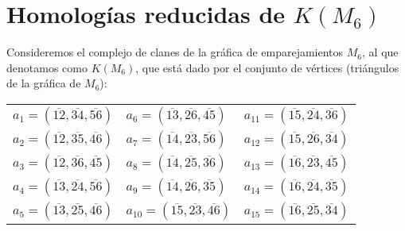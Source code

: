 \documentclass[12pt]{book}
\theoremstyle{definition}
\newcounter{in}
\begin{document}
\section{Homologías reducidas de $K(M_{6})$}
\label{hom-red-KM6}

Consideremos el complejo de clanes de la gráfica de emparejamientos
$M_{6}$, al que denotamos como $K(M_{6})$, que está dado por el
conjunto de vértices (triángulos de la gráfica de
$M_{6}$):

\begin{center}
  \begin{tabular}[h]{lll}
    $a_{1}=(\overline{12},\overline{34},\overline{56})$&$a_{6}=(\overline{13},\overline{26},\overline{45})$&$a_{11}=(\overline{15},\overline{24},\overline{36})$  \\
    $a_{2}=(\overline{12},\overline{35},\overline{46})$&$a_{7}=(\overline{14},\overline{23},\overline{56})$&$a_{12}=(\overline{15},\overline{26},\overline{34})$  \\
    $a_{3}=(\overline{12},\overline{36},\overline{45})$&$a_{8}=(\overline{14},\overline{25},\overline{36})$&$a_{13}=(\overline{16},\overline{23},\overline{45})$  \\
    $a_{4}=(\overline{13},\overline{24},\overline{56})$&$a_{9}=(\overline{14},\overline{26},\overline{35})$&$a_{14}=(\overline{16},\overline{24},\overline{35})$ \\
    $a_{5}=(\overline{13},\overline{25},\overline{46})$&$a_{10}=(\overline{15},\overline{23},\overline{46})$&$a_{15}=(\overline{16},\overline{25},\overline{34})$  
  \end{tabular}
\end{center}
\end{document}
